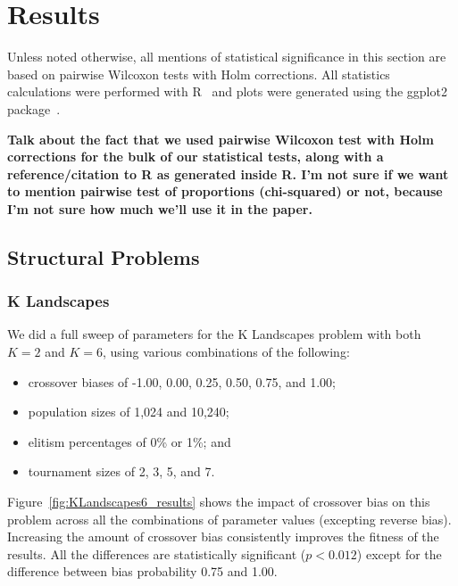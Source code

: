 \documentclass{sig-alternate}
\begin{document}
\section{Results} \label{sec:Results}

Unless noted otherwise, all mentions of statistical significance in this section are based on 
pairwise Wilcoxon tests with Holm corrections. All statistics calculations were performed with R~\cite{R} 
and plots were generated using the ggplot2 package~\cite{ggplot2Book}.

\textbf{Talk about the fact that we used pairwise Wilcoxon test with Holm corrections for the bulk of our statistical 
tests, along with a reference/citation to R as generated inside R. I'm not sure if we want to mention pairwise test of 
proportions (chi-squared) or not, because I'm not sure how much we'll use it in the paper.}

\subsection{Structural Problems}

\subsubsection{K Landscapes}

We did a full sweep of parameters for the K Landscapes problem with both $K=2$ and $K=6$, 
using various combinations of the following:

\begin{itemize}
	\item crossover biases of -1.00, 0.00, 0.25, 0.50, 0.75, and 1.00;
	\item population sizes of 1,024 and 10,240;
	\item elitism percentages of 0\% or 1\%; and
	\item tournament sizes of 2, 3, 5, and 7.
\end{itemize}

Figure~\ref{fig:KLandscapes6_results} shows the impact of crossover bias on this problem across all the combinations of
parameter values (excepting reverse bias). Increasing the amount of crossover bias consistently improves the fitness of
the results. All the differences are statistically significant ($p < 0.012$) except for the difference between bias
probability 0.75 and 1.00.

%
%
%
%
\end{document}
